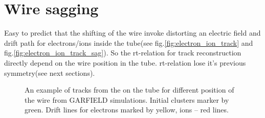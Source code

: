 \documentclass[]{article}
\begin{document}
	\section{ Wire sagging}
	Easy to predict that the shifting of the wire invoke distorting an electric field and drift path for electrons/ions inside the tube(see fig.\ref{fig:electron_ion_track} and fig.\ref{fig:electron_ion_track_sag}). So the rt-relation for track reconstruction directly depend on the wire position in the tube. rt-relation lose it's previous symmetry(see next sections). 
	
	\begin{figure}[h!]
		\centering
		\qquad
		\caption{ An example of tracks from the on the tube for different position of the wire from GARFIELD simulations. Initial clusters marker by green. Drift lines for electrons marked by yellow, ions -- red lines.}
	\end{figure}
	
\end{document}
